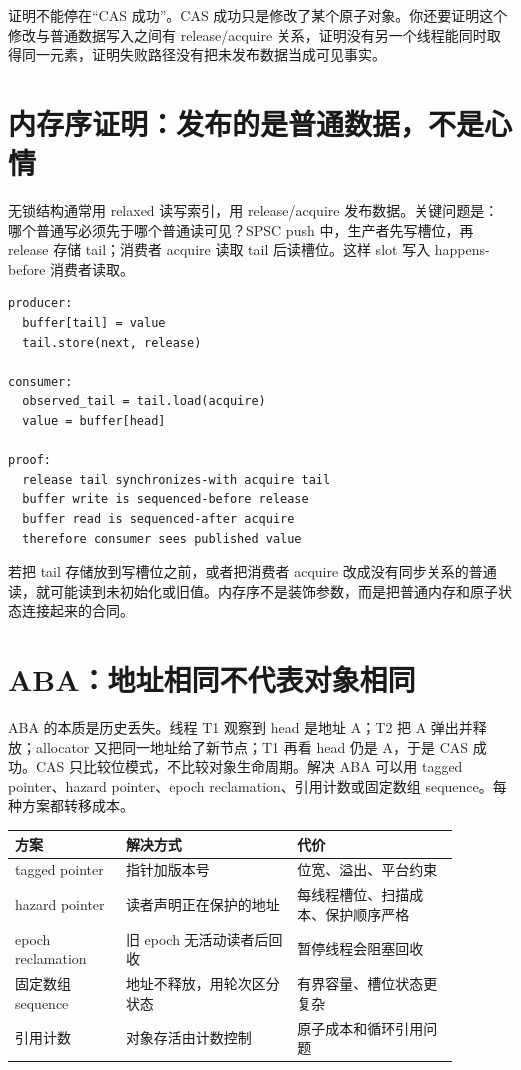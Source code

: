 证明不能停在“CAS 成功”。CAS 成功只是修改了某个原子对象。你还要证明这个修改与普通数据写入之间有 release/acquire 关系，证明没有另一个线程能同时取得同一元素，证明失败路径没有把未发布数据当成可见事实。

\section{内存序证明：发布的是普通数据，不是心情}

无锁结构通常用 relaxed 读写索引，用 release/acquire 发布数据。关键问题是：哪个普通写必须先于哪个普通读可见？SPSC push 中，生产者先写槽位，再 release 存储 tail；消费者 acquire 读取 tail 后读槽位。这样 slot 写入 happens-before 消费者读取。

\begin{lstlisting}[numbers=none,caption={SPSC push/pop 的 happens-before 证明}]
producer:
  buffer[tail] = value
  tail.store(next, release)

consumer:
  observed_tail = tail.load(acquire)
  value = buffer[head]

proof:
  release tail synchronizes-with acquire tail
  buffer write is sequenced-before release
  buffer read is sequenced-after acquire
  therefore consumer sees published value
\end{lstlisting}

若把 tail 存储放到写槽位之前，或者把消费者 acquire 改成没有同步关系的普通读，就可能读到未初始化或旧值。内存序不是装饰参数，而是把普通内存和原子状态连接起来的合同。

\section{ABA：地址相同不代表对象相同}

ABA 的本质是历史丢失。线程 T1 观察到 head 是地址 A；T2 把 A 弹出并释放；allocator 又把同一地址给了新节点；T1 再看 head 仍是 A，于是 CAS 成功。CAS 只比较位模式，不比较对象生命周期。解决 ABA 可以用 tagged pointer、hazard pointer、epoch reclamation、引用计数或固定数组 sequence。每种方案都转移成本。

\begin{center}
\small
\begin{tabular}{p{0.22\linewidth}p{0.34\linewidth}p{0.32\linewidth}}
\toprule
方案 & 解决方式 & 代价 \\
\midrule
tagged pointer & 指针加版本号 & 位宽、溢出、平台约束 \\
hazard pointer & 读者声明正在保护的地址 & 每线程槽位、扫描成本、保护顺序严格 \\
epoch reclamation & 旧 epoch 无活动读者后回收 & 暂停线程会阻塞回收 \\
固定数组 sequence & 地址不释放，用轮次区分状态 & 有界容量、槽位状态更复杂 \\
引用计数 & 对象存活由计数控制 & 原子成本和循环引用问题 \\
\bottomrule
\end{tabular}
\end{center}

